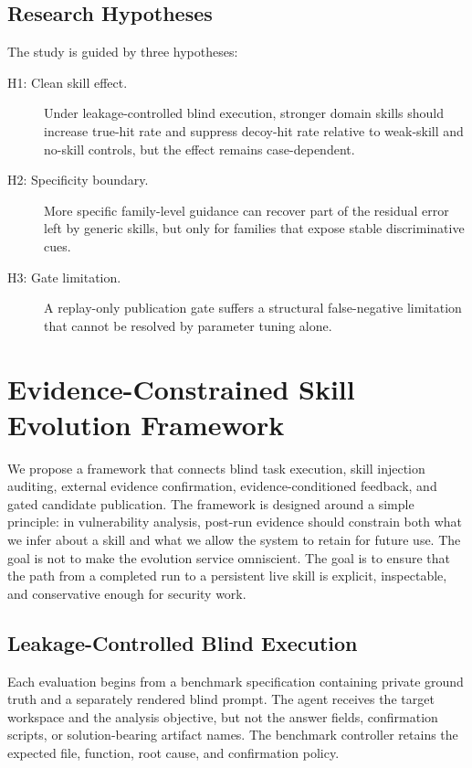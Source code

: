 ﻿\documentclass[preprint,12pt]{elsarticle}
\begin{document}
\subsection{Research Hypotheses}

The study is guided by three hypotheses:

\begin{description}
    \item[H1: Clean skill effect.] Under leakage-controlled blind
    execution, stronger domain skills should increase true-hit rate and
    suppress decoy-hit rate relative to weak-skill and no-skill controls,
    but the effect remains case-dependent.
    \item[H2: Specificity boundary.] More specific family-level guidance can
    recover part of the residual error left by generic skills, but only for
    families that expose stable discriminative cues.
    \item[H3: Gate limitation.] A replay-only publication gate suffers a
    structural false-negative limitation that cannot be resolved by
    parameter tuning alone.
\end{description}

\section{Evidence-Constrained Skill Evolution Framework}
\label{sec:method}

We propose a framework that connects blind task execution, skill injection
auditing, external evidence confirmation, evidence-conditioned feedback,
and gated candidate publication.  The framework is designed around a simple
principle: in vulnerability analysis, post-run evidence should constrain
both what we infer about a skill and what we allow the system to retain for
future use.  The goal is not to make the evolution service omniscient.  The
goal is to ensure that the path from a completed run to a persistent live
skill is explicit, inspectable, and conservative enough for security work.

\subsection{Leakage-Controlled Blind Execution}
\label{sec:blind}

Each evaluation begins from a benchmark specification containing private
ground truth and a separately rendered blind prompt.  The agent receives
the target workspace and the analysis objective, but not the answer fields,
confirmation scripts, or solution-bearing artifact names.  The benchmark
controller retains the expected file, function, root cause, and
confirmation policy.
\end{document}
